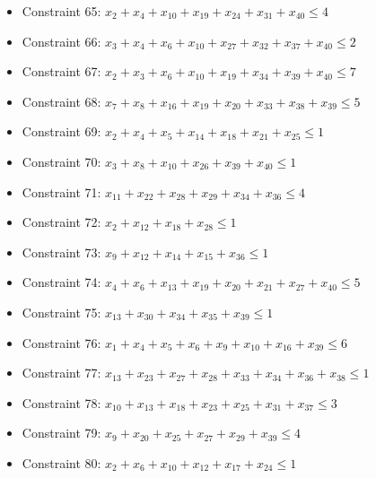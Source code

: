 \documentclass[11pt]{article}
\begin{document}
\begin{itemize}
\item Constraint 65: $x_{2} + x_{4} + x_{10} + x_{19} + x_{24} + x_{31} + x_{40} \le 4$
\item Constraint 66: $x_{3} + x_{4} + x_{6} + x_{10} + x_{27} + x_{32} + x_{37} + x_{40} \le 2$
\item Constraint 67: $x_{2} + x_{3} + x_{6} + x_{10} + x_{19} + x_{34} + x_{39} + x_{40} \le 7$
\item Constraint 68: $x_{7} + x_{8} + x_{16} + x_{19} + x_{20} + x_{33} + x_{38} + x_{39} \le 5$
\item Constraint 69: $x_{2} + x_{4} + x_{5} + x_{14} + x_{18} + x_{21} + x_{25} \le 1$
\item Constraint 70: $x_{3} + x_{8} + x_{10} + x_{26} + x_{39} + x_{40} \le 1$
\item Constraint 71: $x_{11} + x_{22} + x_{28} + x_{29} + x_{34} + x_{36} \le 4$
\item Constraint 72: $x_{2} + x_{12} + x_{18} + x_{28} \le 1$
\item Constraint 73: $x_{9} + x_{12} + x_{14} + x_{15} + x_{36} \le 1$
\item Constraint 74: $x_{4} + x_{6} + x_{13} + x_{19} + x_{20} + x_{21} + x_{27} + x_{40} \le 5$
\item Constraint 75: $x_{13} + x_{30} + x_{34} + x_{35} + x_{39} \le 1$
\item Constraint 76: $x_{1} + x_{4} + x_{5} + x_{6} + x_{9} + x_{10} + x_{16} + x_{39} \le 6$
\item Constraint 77: $x_{13} + x_{23} + x_{27} + x_{28} + x_{33} + x_{34} + x_{36} + x_{38} \le 1$
\item Constraint 78: $x_{10} + x_{13} + x_{18} + x_{23} + x_{25} + x_{31} + x_{37} \le 3$
\item Constraint 79: $x_{9} + x_{20} + x_{25} + x_{27} + x_{29} + x_{39} \le 4$
\item Constraint 80: $x_{2} + x_{6} + x_{10} + x_{12} + x_{17} + x_{24} \le 1$
\end{itemize}
\end{document}
